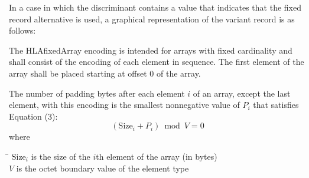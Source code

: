 \begin{center}
    \begingroup\fontsize{7.6}{8.7}\selectfont\setlength{\tabcolsep}{6.5pt}\renewcommand{\arraystretch}{1.32}
    \endgroup
\end{center}

In a case in which the discriminant contains a value that indicates that the fixed record alternative is used, a graphical representation of the variant record is as follows:

\begin{center}
    \begingroup\fontsize{7.6}{8.7}\selectfont\setlength{\tabcolsep}{8.0pt}\renewcommand{\arraystretch}{1.32}
    \endgroup
\end{center}

\par{}\par\vspace{1pt}
The HLAfixedArray encoding is intended for arrays with fixed cardinality and shall consist of the encoding of each element in sequence. The first element of the array shall be placed starting at offset 0 of the array.

The number of padding bytes after each element $i$ of an array, except the last element, with this encoding is the smallest nonnegative value of $P_i$ that satisfies Equation (3):
\begin{equation}
    (\mathrm{Size}_i + P_i) \bmod V = 0
\end{equation}
where
\begin{tabbing}
    \hspace{34pt}\=\kill
    $\mathrm{Size}_i$ \> is the size of the $i$th element of the array (in bytes)\\
    $V$ \> is the octet boundary value of the element type
\end{tabbing}

